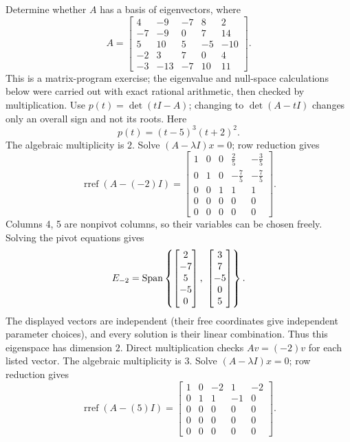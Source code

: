 \goal Determine whether $A$ has a basis of eigenvectors, where
\[A=\begin{bmatrix}4&-9&-7&8&2\\-7&-9&0&7&14\\5&10&5&-5&-10\\-2&3&7&0&4\\-3&-13&-7&10&11\end{bmatrix}.\]
This is a matrix-program exercise; the eigenvalue and null-space calculations below were carried out with exact rational arithmetic, then checked by multiplication.
Use $p(t)=\det(tI-A)$; changing to $\det(A-tI)$ changes only an overall sign and not its roots. Here
\[p(t)=\left(t - 5\right)^{3} \left(t + 2\right)^{2}.\]
The algebraic multiplicity is $2$. Solve $(A-\lambda I)x=0$; row reduction gives
\[\operatorname{rref}(A-(-2)I)=\begin{bmatrix}1&0&0&\frac{2}{5}&- \frac{3}{5}\\0&1&0&- \frac{7}{5}&- \frac{7}{5}\\0&0&1&1&1\\0&0&0&0&0\\0&0&0&0&0\end{bmatrix}.\]
Columns 4, 5 are nonpivot columns, so their variables can be chosen freely. Solving the pivot equations gives
\[E_{-2}=\Span\left\{\begin{bmatrix}2\\-7\\5\\-5\\0\end{bmatrix},\ \begin{bmatrix}3\\7\\-5\\0\\5\end{bmatrix}\right\}.\]
The displayed vectors are independent (their free coordinates give independent parameter choices), and every solution is their linear combination. Thus this eigenspace has dimension $2$. Direct multiplication checks $Av=(-2)v$ for each listed vector.
The algebraic multiplicity is $3$. Solve $(A-\lambda I)x=0$; row reduction gives
\[\operatorname{rref}(A-(5)I)=\begin{bmatrix}1&0&-2&1&-2\\0&1&1&-1&0\\0&0&0&0&0\\0&0&0&0&0\\0&0&0&0&0\end{bmatrix}.\]
